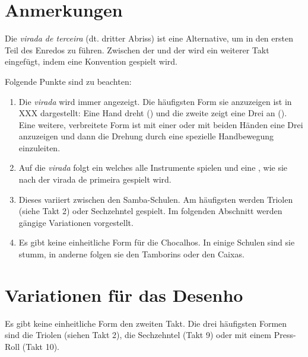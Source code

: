\documentclass[a4paper,12pt]{bescript}
\begin{document}
\section*{Anmerkungen}
Die {\it virada de terceira} (dt. dritter Abriss) ist eine Alternative, um in den ersten Teil des Enredos zu führen. Zwischen der  und der  wird ein weiterer Takt eingefügt, indem eine Konvention gespielt wird.

\noindent Folgende Punkte sind zu beachten:
\begin{enumerate}


 \item Die {\it virada} wird immer angezeigt. Die häufigsten Form sie anzuzeigen ist in XXX dargestellt: Eine Hand dreht () und die zweite zeigt eine Drei an (). Eine weitere, verbreitete Form ist mit einer oder mit beiden Händen eine Drei anzuzeigen und dann die Drehung durch eine spezielle Handbewegung einzuleiten.

 \item Auf die {\it virada} folgt ein  welches alle Instrumente spielen und eine , wie sie nach der virada de primeira gespielt wird.
 \item Dieses  variiert zwischen den Samba-Schulen. Am häufigsten werden Triolen (siehe Takt 2) oder Sechzehntel gespielt. Im folgenden Abschnitt werden gängige Variationen vorgestellt.

 \item Es gibt keine einheitliche Form für die Chocalhos. In einige Schulen sind sie stumm, in anderne folgen sie den Tamborins oder den Caixas.

\end{enumerate}

\section*{Variationen für das Desenho}
Es gibt keine einheitliche Form den zweiten Takt. Die drei häufigsten Formen sind die Triolen (siehen Takt 2), die Sechzehntel (Takt 9) oder mit einem Press-Roll (Takt 10).
\end{document}
